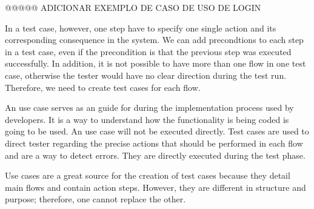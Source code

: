 @@@@@ ADICIONAR EXEMPLO DE CASO DE USO DE LOGIN

In a test case, however, one step have to specify one single action and its corresponding consequence in the system. We can add precondtions to each step in a test case, even if the precondition is that the previous step was executed successfully. In addition, it is not possible to have more than one flow in one test case, otherwise the tester would have no clear direction during the test run. Therefore, we need to create test cases for each flow.

An use case serves as an guide for during the implementation process used by developers. It is a way to understand how the functionality is being coded is going to be used. An use case will not be executed directly. Test cases are used to direct tester regarding the precise actions that should be performed in each flow and are a way to detect errors. They are directly executed during the test phase.

Use cases are a great source for the creation of test cases because they detail main flows and contain action steps. However, they are different in structure and purpose; therefore, one cannot replace the other.

